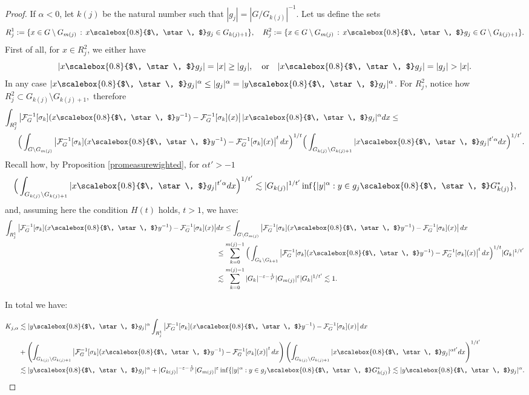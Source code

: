 \documentclass[12pt, reqno]{amsart}
\newcommand{\1}{\mathds{1}}
\newcommand{\smallstar}{\scalebox{0.8}{$\, \star \, $}}
\begin{document}
\begin{proof}
If $\alpha<0$, let $k(j)$ be the natural number such that $|g_j|=|G/G_{k(j)}|^{-1}$. Let us define the sets $$R_j^1 := \{ x \in G \setminus G_{m(j)} \, : \, x \smallstar g_j \in G_{k(j) +1} \}, \quad R_j^2 := \{ x \in G \setminus G_{m(j)} \, : \, x \smallstar g_j \in G \setminus G_{k(j) +1} \}.$$First of all, for $x\in R_j^2$, we either have $$|x \smallstar g_{j}| = |x|\geq|g_j|, \quad \text{or} \quad |x \smallstar g_{j}|= |g_j|>|x|.$$In any case $|x \smallstar g_{j}|^\alpha \leq |g_j|^\alpha = |y \smallstar g_j|^\alpha$. For $R_j^2$, notice how $R_j^2 \subset G_{k(j)} \setminus G_{k(j)+1},$ therefore \begin{align*}
    \int_{R_j^2} & \left|  \mathcal{F}_{G}^{-1}[\sigma_{k}](x \smallstar y^{-1})-\mathcal{F}_{G}^{-1}[\sigma_{k}](x)\right|  |x \smallstar g_{j}|^{\alpha} d x  \leq  \\ & \Big( \int_{G \setminus G_{m(j)}}\left|\mathcal{F}_{G}^{-1}[\sigma_{k}](x \smallstar y^{-1})-\mathcal{F}_{G}^{-1}[\sigma_{k}](x)\right|^t d x\Big)^{1/t} \Big( \int_{G_{k(j)} \setminus G_{k(j)+1}} |x \smallstar g_{j}|^{t' \alpha} dx  \Big)^{1/t'} .
\end{align*}
Recall how, by Proposition \ref{promeasurewighted}, for $\alpha t' > -1$ $$\Big( \int_{G_{k(j)} \setminus G_{k(j)+1}} |x \smallstar g_{j}|^{t' \alpha} dx  \Big)^{1/t'} \lesssim  |G_{k(j)}|^{1/t'}\inf\{|y|^{\alpha}:y\in g_j \smallstar G^{*}_{k(j)}\} ,$$
and, assuming here the condition $H(t)$ holds, $t>1$, we have:
\begin{align*}
    \int_{R_j^1} \left|\mathcal{F}_{G}^{-1}[\sigma_{k}](x \smallstar y^{-1}) -\mathcal{F}_{G}^{-1}[\sigma_{k}](x) \right| &d x  \leq \int_{G \setminus G_{m(j)}} \left|\mathcal{F}_{G}^{-1}[\sigma_{k}](x \smallstar y^{-1})-\mathcal{F}_{G}^{-1}[\sigma_{k}](x)\right|d x \\ & \leq \sum_{k=0}^{m(j) -1 } \Big( \int_{G_k \setminus G_{k+1}} \left|\mathcal{F}_{G}^{-1}[\sigma_{k}](x \smallstar y^{-1})-\mathcal{F}_{G}^{-1}[\sigma_{k}](x)\right|^td x \Big)^{1/t} |G_k|^{1/t'} \\ &\lesssim \sum_{k=0}^{m(j) -1 } |G_k|^{- \varepsilon - \frac{1}{t'}} |G_{m(j)}|^{\varepsilon} |G_k|^{1/t'} \lesssim 1.
\end{align*}

In total we have:


\begin{align*}
K_{j,\alpha} &\lesssim |y \smallstar g_j|^\alpha \int_{R_j^1} \left|\mathcal{F}_{G}^{-1}[\sigma_{k}](x \smallstar y^{-1})-\mathcal{F}_{G}^{-1}[\sigma_{k}](x)\right|d x \\  &+ \left(\int_{G_{k(j)} \backslash G_{k(j)+1}} \left|\mathcal{F}_{G}^{-1}[\sigma_{k}](x \smallstar y^{-1})-\mathcal{F}_{G}^{-1}[\sigma_{k}](x)\right|^{t} d x \right) \left(\int_{G_{k(j)} \backslash G_{k(j)+1}}|x \smallstar g_{j}|^{\alpha t^{\prime}} d x\right)^{1 / t^{\prime}}  \\ &\lesssim |y \smallstar g_j|^\alpha + |G_{k(j)}|^{- \varepsilon - \frac{1}{t'}} |G_{m(j)}|^{\varepsilon} \inf\{|y|^{\alpha}:y\in g_j \smallstar G^{*}_{k(j)}\} \lesssim |y \smallstar g_j|^\alpha.
\end{align*}


\end{proof}
\end{document}
